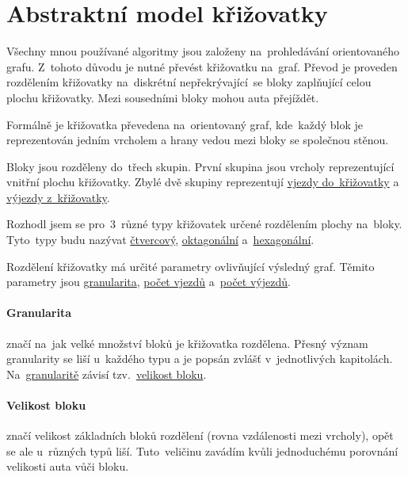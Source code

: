 \section{Abstraktní model křižovatky}\label{sec:krizovatka}

%


Všechny mnou používané algoritmy jsou založeny na~prohledávání orientovaného grafu.
Z~tohoto důvodu je nutné převést křižovatku na~graf.
Převod je proveden rozdělením křižovatky na~diskrétní nepřekrývající~se bloky zaplňující celou plochu křižovatky.
Mezi sousedními bloky mohou auta přejíždět.

Formálně je křižovatka převedena na~orientovaný graf,
kde~každý blok je reprezentován jedním vrcholem a hrany vedou mezi bloky se společnou stěnou.

Bloky jsou rozděleny do~třech skupin.
První skupina jsou vrcholy reprezentující vnitřní plochu křižovatky.
Zbylé dvě skupiny reprezentují \hyperref[par:vjezdy]{vjezdy do~křižovatky} a \hyperref[par:vyjezdy]{výjezdy z~křižovatky}.

Rozhodl jsem se pro~$3$~různé typy křižovatek určené rozdělením plochy na~bloky.
Tyto~typy budu nazývat \hyperref[subsec:ctvercovy_typ]{čtvercový}, \hyperref[subsec:oktagonalni_typ]{oktagonální}
a~\hyperref[subsec:hexagonalni_typ]{hexagonální}.

Rozdělení křižovatky má určité parametry ovlivňující výsledný graf.
Těmito parametry jsou \hyperref[par:granularita]{granularita},
\hyperref[par:vjezdy]{počet vjezdů} a~\hyperref[par:vyjezdy]{počet výjezdů}.

\paragraph{Granularita}\label{par:granularita} značí na~jak velké množství bloků je křižovatka rozdělena.
Přesný význam granularity se liší u~každého typu a je popsán zvlášť v~jednotlivých kapitolách.
Na~\hyperref[par:granularita]{granularitě} závisí tzv.~\hyperref[par:velikost_bloku]{velikost bloku}.

\paragraph{Velikost bloku}\label{par:velikost_bloku} značí velikost základních bloků rozdělení
(rovna vzdálenosti mezi vrcholy), opět se ale u~různých typů liší.
Tuto~veličinu zavádím kvůli jednoduchému porovnání velikosti auta vůči bloku.

